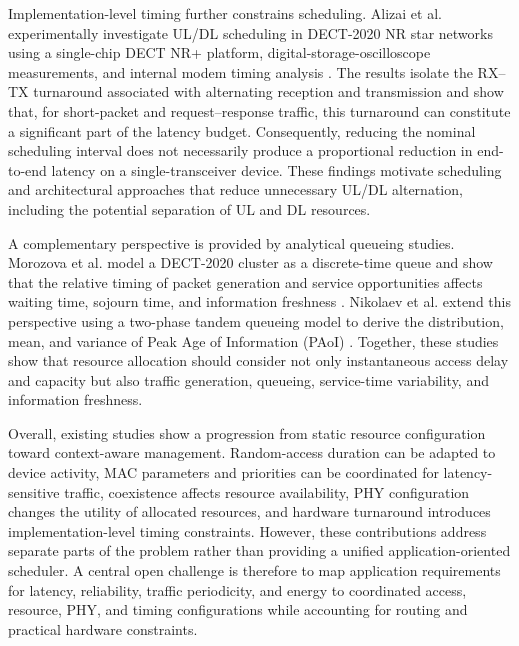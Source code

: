 Implementation-level timing further constrains scheduling. Alizai et al. experimentally investigate UL/DL scheduling in DECT-2020 NR star networks using a single-chip DECT NR+ platform, digital-storage-oscilloscope measurements, and internal modem timing analysis \cite{alizaiMeasurementDrivenLatencyAnalysis2026}. The results isolate the RX--TX turnaround associated with alternating reception and transmission and show that, for short-packet and request--response traffic, this turnaround can constitute a significant part of the latency budget. Consequently, reducing the nominal scheduling interval does not necessarily produce a proportional reduction in end-to-end latency on a single-transceiver device. These findings motivate scheduling and architectural approaches that reduce unnecessary UL/DL alternation, including the potential separation of UL and DL resources.

A complementary perspective is provided by analytical queueing studies. Morozova et al. model a DECT-2020 cluster as a discrete-time queue and show that the relative timing of packet generation and service opportunities affects waiting time, sojourn time, and information freshness \cite{morozovaComparisonTwoModels2026a}. Nikolaev et al. extend this perspective using a two-phase tandem queueing model to derive the distribution, mean, and variance of Peak Age of Information (PAoI) \cite{nikolaevModelingDECT2020Tandem2026}. Together, these studies show that resource allocation should consider not only instantaneous access delay and capacity but also traffic generation, queueing, service-time variability, and information freshness.

Overall, existing studies show a progression from static resource configuration toward context-aware management. Random-access duration can be adapted to device activity, MAC parameters and priorities can be coordinated for latency-sensitive traffic, coexistence affects resource availability, PHY configuration changes the utility of allocated resources, and hardware turnaround introduces implementation-level timing constraints. However, these contributions address separate parts of the problem rather than providing a unified application-oriented scheduler. A central open challenge is therefore to map application requirements for latency, reliability, traffic periodicity, and energy to coordinated access, resource, PHY, and timing configurations while accounting for routing and practical hardware constraints.

